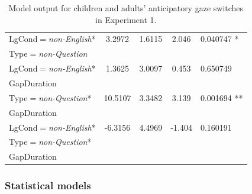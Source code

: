 \documentclass[authoryear, 12pt]{elsarticle}
\begin{document}
\begin{table}[h!]
\begin{small}
\begin{center}
\begin{tabular}{lcccl}
    LgCond$=$\textit{non-English}*			& 3.2972			& 1.6115		& 2.046	& 0.040747 * 	\\ 
    \hspace*{5mm} Type$=$\textit{non-Question} &&&& \\
    LgCond$=$\textit{non-English}*			& 1.3625			& 3.0097		& 0.453	& 0.650749     	\\
    \hspace*{5mm} GapDuration &&&& \\
    Type$=$\textit{non-Question}*				& 10.5107		& 3.3482		& 3.139	& 0.001694 ** 	\\
    \hspace*{5mm} GapDuration &&&& \\
    LgCond$=$\textit{non-English}*			& -6.3156		& 4.4969		& -1.404	& 0.160191 	\\    
    \hspace*{5mm} Type$=$\textit{non-Question}* &&&& \\
    \hspace*{5mm} GapDuration &&&& \\
    \hline
  \end{tabular}
\end{center}
  \end{small}
  \caption{Model output for children and adults' anticipatory gaze switches in Experiment 1.}
\label{tab:E1-models}
\end{table}



\subsubsection{Statistical models}
\label{sec:models1}
\end{document}
